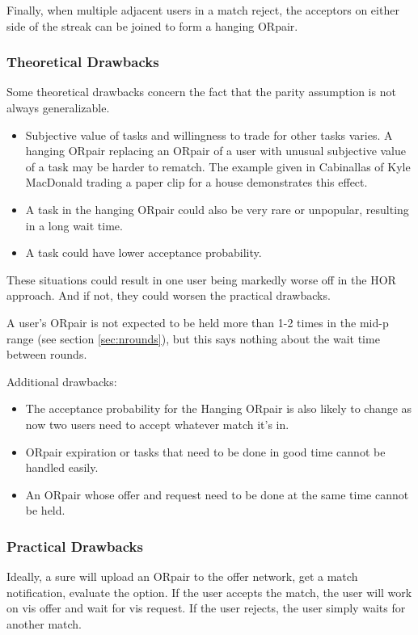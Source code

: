 \documentclass[main.tex]{subfiles}
\begin{document}
Finally, when multiple adjacent users in a match reject, the acceptors on either side of the streak can be joined to form a hanging ORpair.

\subsubsection{Theoretical Drawbacks}\label{sec:theoretical drawbacks}
Some theoretical drawbacks concern the fact that the parity assumption is not always generalizable.

\begin{itemize}
  \item Subjective value of tasks and willingness to trade for other tasks varies. A hanging ORpair replacing an ORpair of a user with unusual subjective value of a task may be harder to rematch. The example given in Cabinallas \cite{Cab0} of Kyle MacDonald trading a paper clip for a house demonstrates this effect.
  \item A task in the hanging ORpair could also be very rare or unpopular, resulting in a long wait time.
  \item A task could have lower acceptance probability.
\end{itemize}

These situations could result in one user being markedly worse off in the HOR approach. And if not, they could worsen the practical drawbacks.

A user's ORpair is not expected to be held more than 1-2 times in the mid-p range (see section \ref{sec:nrounds}), but this says nothing about the wait time between rounds.

Additional drawbacks:
\begin{itemize}
  \item The acceptance probability for the Hanging ORpair is also likely to change as now two users need to accept whatever match it's in.
  \item ORpair expiration or tasks that need to be done in good time cannot be handled easily.
  \item An ORpair whose offer and request need to be done at the same time cannot be held.
\end{itemize}


\subsubsection{Practical Drawbacks}
Ideally, a sure will upload an ORpair to the offer network, get a match notification, evaluate the option. If the user accepts the match, the user will work on vis offer and wait for vis request. If the user rejects, the user simply waits for another match.
\end{document}
